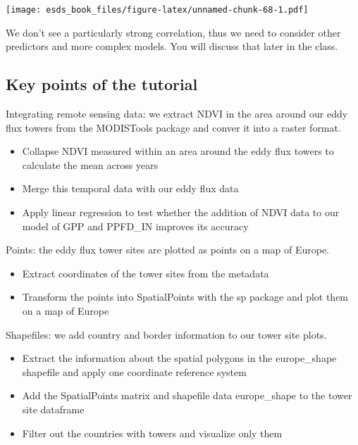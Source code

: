 \documentclass[
]{book}
\providecommand{\tightlist}{%
  \setlength{\itemsep}{0pt}\setlength{\parskip}{0pt}}
\begin{document}
\texttt{[image: esds\_book\_files/figure-latex/unnamed-chunk-68-1.pdf]}

We don't see a particularly strong correlation, thus we need to consider other predictors and more complex models. You will discuss that later in the class.

\hypertarget{key-points-of-the-tutorial}{%
\subsection{Key points of the tutorial}\label{key-points-of-the-tutorial}}

Integrating remote sensing data: we extract NDVI in the area around our eddy flux towers from the MODISTools package and conver it into a raster format.

\begin{itemize}
\tightlist
\item
  Collapse NDVI measured within an area around the eddy flux towers to calculate the mean across years
\item
  Merge this temporal data with our eddy flux data
\item
  Apply linear regression to test whether the addition of NDVI data to our model of GPP and PPFD\_IN improves its accuracy
\end{itemize}

Points:
the eddy flux tower sites are plotted as points on a map of Europe.

\begin{itemize}
\tightlist
\item
  Extract coordinates of the tower sites from the metadata
\item
  Transform the points into SpatialPoints with the sp package and plot them on a map of Europe
\end{itemize}

Shapefiles: we add country and border information to our tower site plots.

\begin{itemize}
\tightlist
\item
  Extract the information about the spatial polygons in the europe\_shape shapefile and apply one coordinate reference system
\item
  Add the SpatialPoints matrix and shapefile data europe\_shape to the tower site dataframe
\item
  Filter out the countries with towers and visualize only them
\end{itemize}
\end{document}
